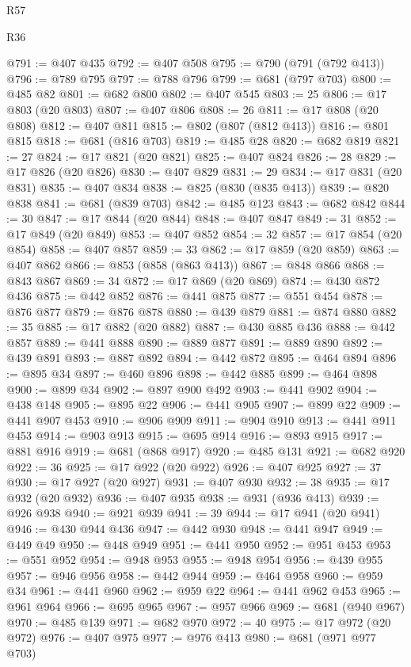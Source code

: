 \begin{lexlean}{R57}
\begin{lexlean}{R36}
\begin{coremodule}
{{{{{{{{{{{{{{{{{{{{{{{{{{{{{{{{{{{{{{{{{{{{{{{{{{{{{{{{{{{{{{{{{{{{{{{{{{{{{{{{{{@791 := @407 @435
@792 := @407 @508
@795 := @790 (@791 (@792 @413))
@796 := @789 @795
@797 := @788 @796
@799 := @681 (@797 @703)
@800 := @485 @82
@801 := @682 @800
@802 := @407 @545
@803 := 25
@806 := @17 @803 (@20 @803)
@807 := @407 @806
@808 := 26
@811 := @17 @808 (@20 @808)
@812 := @407 @811
@815 := @802 (@807 (@812 @413))
@816 := @801 @815
@818 := @681 (@816 @703)
@819 := @485 @28
@820 := @682 @819
@821 := 27
@824 := @17 @821 (@20 @821)
@825 := @407 @824
@826 := 28
@829 := @17 @826 (@20 @826)
@830 := @407 @829
@831 := 29
@834 := @17 @831 (@20 @831)
@835 := @407 @834
@838 := @825 (@830 (@835 @413))
@839 := @820 @838
@841 := @681 (@839 @703)
@842 := @485 @123
@843 := @682 @842
@844 := 30
@847 := @17 @844 (@20 @844)
@848 := @407 @847
@849 := 31
@852 := @17 @849 (@20 @849)
@853 := @407 @852
@854 := 32
@857 := @17 @854 (@20 @854)
@858 := @407 @857
@859 := 33
@862 := @17 @859 (@20 @859)
@863 := @407 @862
@866 := @853 (@858 (@863 @413))
@867 := @848 @866
@868 := @843 @867
@869 := 34
@872 := @17 @869 (@20 @869)
@874 := @430 @872 @436
@875 := @442 @852
@876 := @441 @875
@877 := @551 @454
@878 := @876 @877
@879 := @876 @878
@880 := @439 @879
@881 := @874 @880
@882 := 35
@885 := @17 @882 (@20 @882)
@887 := @430 @885 @436
@888 := @442 @857
@889 := @441 @888
@890 := @889 @877
@891 := @889 @890
@892 := @439 @891
@893 := @887 @892
@894 := @442 @872
@895 := @464 @894
@896 := @895 @34
@897 := @460 @896
@898 := @442 @885
@899 := @464 @898
@900 := @899 @34
@902 := @897 @900 @492
@903 := @441 @902
@904 := @438 @148
@905 := @895 @22
@906 := @441 @905
@907 := @899 @22
@909 := @441 @907 @453
@910 := @906 @909
@911 := @904 @910
@913 := @441 @911 @453
@914 := @903 @913
@915 := @695 @914
@916 := @893 @915
@917 := @881 @916
@919 := @681 (@868 @917)
@920 := @485 @131
@921 := @682 @920
@922 := 36
@925 := @17 @922 (@20 @922)
@926 := @407 @925
@927 := 37
@930 := @17 @927 (@20 @927)
@931 := @407 @930
@932 := 38
@935 := @17 @932 (@20 @932)
@936 := @407 @935
@938 := @931 (@936 @413)
@939 := @926 @938
@940 := @921 @939
@941 := 39
@944 := @17 @941 (@20 @941)
@946 := @430 @944 @436
@947 := @442 @930
@948 := @441 @947
@949 := @449 @49
@950 := @448 @949
@951 := @441 @950
@952 := @951 @453
@953 := @551 @952
@954 := @948 @953
@955 := @948 @954
@956 := @439 @955
@957 := @946 @956
@958 := @442 @944
@959 := @464 @958
@960 := @959 @34
@961 := @441 @960
@962 := @959 @22
@964 := @441 @962 @453
@965 := @961 @964
@966 := @695 @965
@967 := @957 @966
@969 := @681 (@940 @967)
@970 := @485 @139
@971 := @682 @970
@972 := 40
@975 := @17 @972 (@20 @972)
@976 := @407 @975
@977 := @976 @413
@980 := @681 (@971 @977 @703)
}}}}}}}}}}}}}}}}}}}}}}}}}}}}}}}}}}}}}}}}}}}}}}}}}}}}}}}}}}}}}}}}}}}}}}}}}}}}}}}}}}
\end{coremodule}
\end{lexlean}
\end{lexlean}
